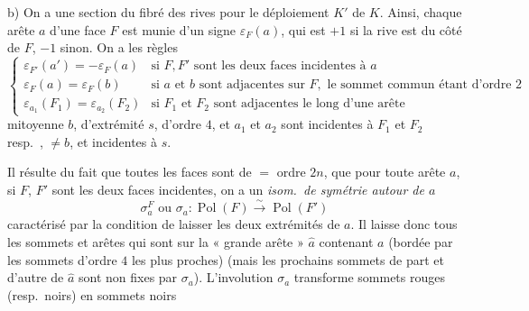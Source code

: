 \documentclass[11pt,a4paper]{article}
\begin{document}
b) \struck{\ill{}} On a une section du fibré des rives pour le déploiement $K'$ de $K$. Ainsi, chaque arête $a$ d'une face $F$ est munie d'un signe $\varepsilon_F(a)$, qui est $+1$ si la rive est du côté de $F$, $-1$ sinon. On a les règles
\[
\left\lbrace
\begin{array}{ll}
\varepsilon_{F'}(a') = -\varepsilon_F(a) & \text{si } F, F' \text{ sont les deux faces incidentes à } a \\
\varepsilon_F(a) = \varepsilon_F(b) & \text{si } a \text{ et } b \text{ sont adjacentes sur } F, \text{ le sommet commun étant d'ordre } 2 \\
\varepsilon_{a_1}(F_1) = \varepsilon_{a_2}(F_2) & \text{si } F_1 \text{ et } F_2 \text{ sont adjacentes le long d'une arête}
\end{array}
\right.
\]
mitoyenne $b$, d'extrémité $s$, d'ordre $4$, et $a_1$ et $a_2$ sont incidentes à $F_1$ et $F_2$ resp.\ \ill{}, $\neq b$, et incidentes à $s$.

Il résulte du fait que toutes les faces sont de $=$ ordre $2n$, que \struck{\ill{}} pour toute arête $a$, si $F$, $F'$ sont les deux faces incidentes, on a un \emph{isom.\ de symétrie autour de $a$}
\[
\sigma_a^F \text{ ou } \sigma_a : \operatorname{Pol}(F) \xrightarrow{\ \sim\ } \operatorname{Pol}(F')
\]
caractérisé par la condition de laisser   les deux extrémités de $a$. Il laisse donc \struck{\ill{}}  \struck{\ill{}} tous les sommets et arêtes qui sont sur la « grande arête » $\widehat{a}$ contenant $a$ (bordée par les sommets d'ordre $4$ les plus proches) (mais \struck{\ill{} \ill{}} les prochains sommets  de part et d'autre de $\widehat{a}$ sont non fixes par $\sigma_a$). L'involution $\sigma_a$ transforme sommets rouges (resp.\ noirs) en sommets noirs
\end{document}
